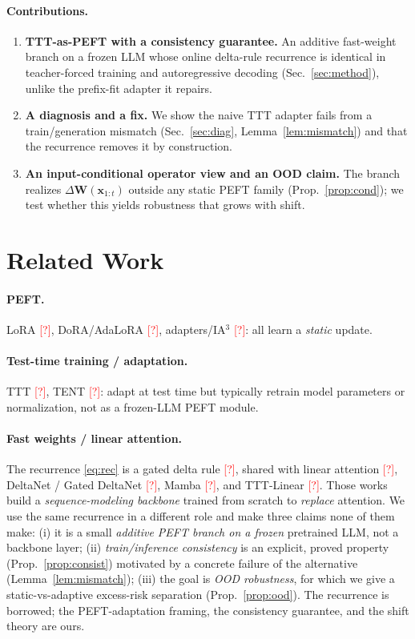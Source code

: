 \documentclass{article}       %
\newcommand{\todocite}{\textcolor{red}{[?]}}
\newcommand{\x}{\bm{x}}\newcommand{\q}{\bm{q}}\newcommand{\bk}{\bm{k}}\newcommand{\vv}{\bm{v}}
\newcommand{\W}{\bm{W}}\newcommand{\B}{\bm{B}}\newcommand{\SM}{\bm{S}}
\begin{document}
\paragraph{Contributions.}
\begin{enumerate}
\item \textbf{TTT-as-PEFT with a consistency guarantee.} An additive fast-weight branch on a frozen LLM whose online
delta-rule recurrence is identical in teacher-forced training and autoregressive decoding (Sec.~\ref{sec:method}), unlike
the prefix-fit adapter it repairs.
\item \textbf{A diagnosis and a fix.} We show the naive TTT adapter fails from a train/generation mismatch
(Sec.~\ref{sec:diag}, Lemma~\ref{lem:mismatch}) and that the recurrence removes it by construction.
\item \textbf{An input-conditional operator view and an OOD claim.} The branch realizes $\Delta\W(\x_{1:t})$ outside any
static PEFT family (Prop.~\ref{prop:cond}); we test whether this yields robustness that grows with shift.
\end{enumerate}

\section{Related Work}
\paragraph{PEFT.} LoRA \todocite{}, DoRA/AdaLoRA \todocite{}, adapters/IA$^3$ \todocite{}: all learn a \emph{static}
update. \paragraph{Test-time training / adaptation.} TTT \todocite{}, TENT \todocite{}: adapt at test time but typically
retrain model parameters or normalization, not as a frozen-LLM PEFT module. \paragraph{Fast weights / linear attention.}
The recurrence \eqref{eq:rec} is a gated delta rule \todocite{}, shared with linear attention \todocite{}, DeltaNet / Gated
DeltaNet \todocite{}, Mamba \todocite{}, and TTT-Linear \todocite{}. Those works build a \emph{sequence-modeling backbone}
trained from scratch to \emph{replace} attention. We use the same recurrence in a different role and make three claims none
of them make: (i) it is a small \emph{additive PEFT branch on a frozen} pretrained LLM, not a backbone layer;
(ii) \emph{train/inference consistency} is an explicit, proved property (Prop.~\ref{prop:consist}) motivated by a concrete
failure of the alternative (Lemma~\ref{lem:mismatch}); (iii) the goal is \emph{OOD robustness}, for which we give a
static-vs-adaptive excess-risk separation (Prop.~\ref{prop:ood}). The recurrence is borrowed; the PEFT-adaptation framing,
the consistency guarantee, and the shift theory are ours.
\end{document}
